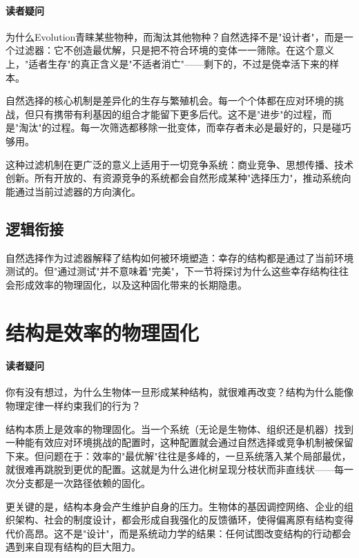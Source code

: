 \documentclass[openany, a4paper, 12pt]{book}
\begin{document}
	\begin{questionbox}
\paragraph*{读者疑问}
为什么Evolution青睐某些物种，而淘汰其他物种？自然选择不是"设计者"，而是一个过滤器：它不创造最优解，只是把不符合环境的变体一一筛除。在这个意义上，"适者生存"的真正含义是"不适者消亡"——剩下的，不过是侥幸活下来的样本。
\end{questionbox}
	
	自然选择的核心机制是差异化的生存与繁殖机会。每一个个体都在应对环境的挑战，但只有携带有利基因的组合才能留下更多后代。这不是"进步"的过程，而是"淘汰"的过程。每一次筛选都移除一批变体，而幸存者未必是最好的，只是碰巧够用。
	
	这种过滤机制在更广泛的意义上适用于一切竞争系统：商业竞争、思想传播、技术创新。所有开放的、有资源竞争的系统都会自然形成某种"选择压力"，推动系统向能通过当前过滤器的方向演化。
	
	\subsection{逻辑衔接}
	自然选择作为过滤器解释了结构如何被环境塑造：幸存的结构都是通过了当前环境测试的。但"通过测试"并不意味着"完美"，下一节将探讨为什么这些幸存结构往往会形成效率的物理固化，以及这种固化带来的长期隐患。
	
	\section{结构是效率的物理固化}
	
	\begin{questionbox}
	\paragraph*{读者疑问}
	你有没有想过，为什么生物体一旦形成某种结构，就很难再改变？结构为什么能像物理定律一样约束我们的行为？
	\end{questionbox}
	
	结构本质上是效率的物理固化。当一个系统（无论是生物体、组织还是机器）找到一种能有效应对环境挑战的配置时，这种配置就会通过自然选择或竞争机制被保留下来。但问题在于：效率的"最优解"往往是多峰的，一旦系统落入某个局部最优，就很难再跳脱到更优的配置。这就是为什么进化树呈现分枝状而非直线状——每一次分支都是一次路径依赖的固化。
	
	更关键的是，结构本身会产生维护自身的压力。生物体的基因调控网络、企业的组织架构、社会的制度设计，都会形成自我强化的反馈循环，使得偏离原有结构变得代价高昂。这不是"设计"，而是系统动力学的结果：任何试图改变结构的行动都会遇到来自现有结构的巨大阻力。
	
\end{document}
